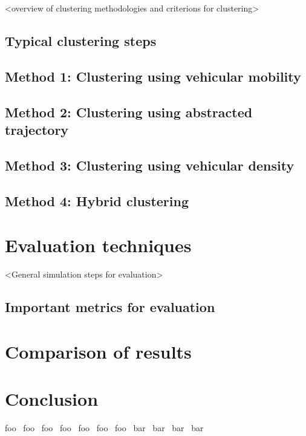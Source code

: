 \documentclass[]{ccs-thesis}
\begin{document}
<overview of clustering methodologies and criterions for clustering>

\section{Typical clustering steps}

\section{Method 1: Clustering using vehicular mobility}
\section{Method 2: Clustering using abstracted trajectory}
\section{Method 3: Clustering using vehicular density}
\section{Method 4: Hybrid clustering}


\chapter{Evaluation techniques}
\label{sec:evaluation}

<General simulation steps for evaluation>

\section{Important metrics for evaluation}



\chapter{Comparison of results}
\label{sec:comparison}



\chapter{Conclusion}
\label{sec:conclusions}

foo~\cite{6256251}
foo~\cite{ARKIAN2014197}
foo~\cite{6737622}
foo~\cite{6685518}
foo~\cite{4976256}
foo~\cite{5416361}
foo~\cite{5735785}
bar~\cite{6379136}
bar~\cite{HASSANABADI2014535}
bar~\cite{sommer2011bidirectionally}
bar~\cite{6407446}
\end{document}
